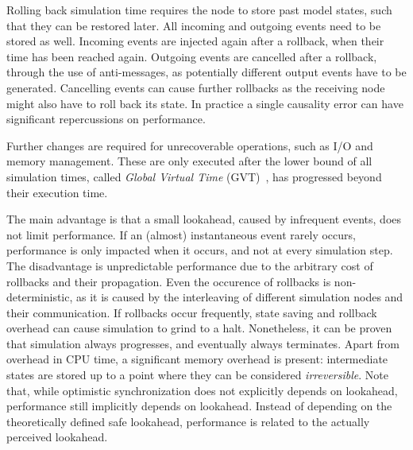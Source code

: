 Rolling back simulation time requires the node to store past model states, such that they can be restored later.
All incoming and outgoing events need to be stored as well.
Incoming events are injected again after a rollback, when their time has been reached again.
Outgoing events are cancelled after a rollback, through the use of anti-messages, as potentially different output events have to be generated.
Cancelling events can cause further rollbacks as the receiving node might also have to roll back its state.
In practice a single causality error can have significant repercussions on performance.

Further changes are required for unrecoverable operations, such as I/O and memory management.
These are only executed after the lower bound of all simulation times, called \textit{Global Virtual Time} (GVT)~\cite{FujimotoBook}, has progressed beyond their execution time.

The main advantage is that a small lookahead, caused by infrequent events, does not limit performance.
If an (almost) instantaneous event rarely occurs, performance is only impacted when it occurs, and not at every simulation step.
The disadvantage is unpredictable performance due to the arbitrary cost of rollbacks and their propagation.
Even the occurence of rollbacks is non-deterministic, as it is caused by the interleaving of different simulation nodes and their communication.
If rollbacks occur frequently, state saving and rollback overhead can cause simulation to grind to a halt.
Nonetheless, it can be proven that simulation always progresses, and eventually always terminates.
Apart from overhead in CPU time, a significant memory overhead is present: intermediate states are stored up to a point where they can be considered \textit{irreversible}.
Note that, while optimistic synchronization does not explicitly depends on lookahead, performance still implicitly depends on lookahead.
Instead of depending on the theoretically defined safe lookahead, performance is related to the actually perceived lookahead.
